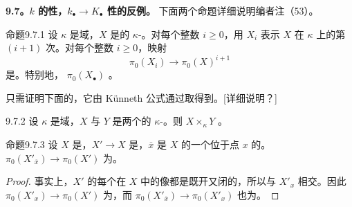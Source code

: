 \textbf{9.7。$k$ 的性，$k_\bullet\to K_\bullet$ 性的反例。} 下面两个命题详细说明编者注（53）。
\begin{SGAresult}{命题}{9.7.1}
设 $\kappa$ 是域，$X$ 是的 $\kappa$-。对每个整数 $i\geq0$，用 $X_i$ 表示 $X$ 在 $\kappa$ 上的第 $(i+1)$ 次。对每个整数 $i\geq0$，映射
\[\pi_0(X_i)\longrightarrow\pi_0(X)^{i+1}\]
是。特别地， $\pi_0(X_\bullet)$ 。
\end{SGAresult}
只需证明下面的，它由 Künneth 公式通过取得到。[详细说明？]
\begin{SGAresult}{}{9.7.2}
设 $\kappa$ 是域，$X$ 与 $Y$ 是两个的 $\kappa$-。则 $X\times_\kappa Y$ 。
\end{SGAresult}
\begin{SGAresult}{命题}{9.7.3}
设 $X$ 是，$X'\to X$ 是，$\overline x$ 是 $X$ 的一个位于点 $x$ 的。 $\pi_0(X'_{\overline x})\to\pi_0(X')$ 为。
\end{SGAresult}
\begin{proof}
事实上，$X'$ 的每个在 $X$ 中的像都是既开又闭的，所以与 $X'_x$ 相交。因此 $\pi_0(X'_x)\to\pi_0(X')$ 为，而 $\pi_0(X'_{\overline x})\to\pi_0(X'_x)$ 也为。
\end{proof}

